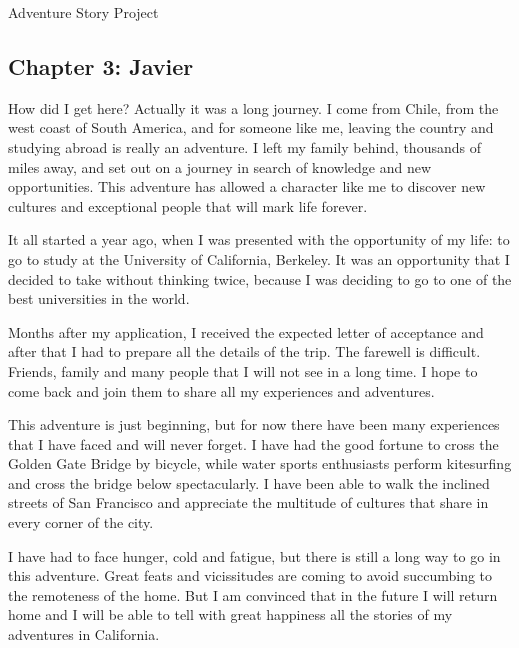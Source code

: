 \documentclass{article}
\begin{document}
\Huge Adventure Story Project

\normalsize

\subsection*{Chapter 3: Javier}

How did I get here? Actually it was a long journey. I come from Chile, from the west coast of South America, and for someone like me, leaving the country and studying abroad is really an adventure. I left my family behind, thousands of miles away, and set out on a journey in search of knowledge and new opportunities. This adventure has allowed a character like me to discover new cultures and exceptional people that will mark life forever.

It all started a year ago, when I was presented with the opportunity of my life: to go to study at the University of California, Berkeley. It was an opportunity that I decided to take without thinking twice, because I was deciding to go to one of the best universities in the world.

Months after my application, I received the expected letter of acceptance and after that I had to prepare all the details of the trip. The farewell is difficult. Friends, family and many people that I will not see in a long time. I hope to come back and join them to share all my experiences and adventures.

This adventure is just beginning, but for now there have been many experiences that I have faced and will never forget. I have had the good fortune to cross the Golden Gate Bridge by bicycle, while water sports enthusiasts perform kitesurfing and cross the bridge below spectacularly. I have been able to walk the inclined streets of San Francisco and appreciate the multitude of cultures that share in every corner of the city.

I have had to face hunger, cold and fatigue, but there is still a long way to go in this adventure. Great feats and vicissitudes are coming to avoid succumbing to the remoteness of the home. But I am convinced that in the future I will return home and I will be able to tell with great happiness all the stories of my adventures in California.
\end{document}
